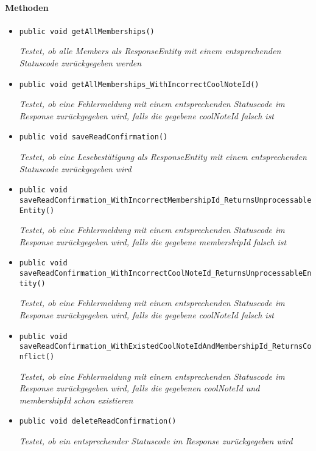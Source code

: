  \paragraph*{Methoden}
 \begin{itemize}
 	\item{\texttt{public void getAllMemberships()}}
 	
 	\textit{Testet, ob alle Members als ResponseEntity mit einem entsprechenden Statuscode zurückgegeben werden}
 	
 	\item{\texttt{public void getAllMemberships\_WithIncorrectCoolNoteId()}}
 	
 	\textit{Testet, ob eine Fehlermeldung mit einem entsprechenden Statuscode im Response zurückgegeben wird, falls die gegebene coolNoteId falsch ist}
 	
 	\item{\texttt{public void saveReadConfirmation()}}
 	
 	\textit{Testet, ob eine Lesebestätigung als ResponseEntity mit einem entsprechenden Statuscode zurückgegeben wird}
 	
 	\item{\texttt{public void saveReadConfirmation\_WithIncorrectMembershipId\_Returns\-UnprocessableEntity()}}
 	
 	\textit{Testet, ob eine Fehlermeldung mit einem entsprechenden Statuscode im Response zurückgegeben wird, falls die gegebene membershipId falsch ist}
 	
 	\item{\texttt{public void saveReadConfirmation\_WithIncorrectCoolNoteId\_Returns\-UnprocessableEntity()}}
 	
 	\textit{Testet, ob eine Fehlermeldung mit einem entsprechenden Statuscode im Response zurückgegeben wird, falls die gegebene coolNoteId falsch ist}
 	
 	\item{\texttt{public void saveReadConfirmation\_WithExistedCoolNoteId\-AndMembershipId\_ReturnsConflict()}}
 	
 	\textit{Testet, ob eine Fehlermeldung mit einem entsprechenden Statuscode im Response zurückgegeben wird, falls die gegebenen coolNoteId und membershipId schon existieren} 	
 	
 	\item{\texttt{public void deleteReadConfirmation()}}
 	
 	\textit{Testet, ob ein entsprechender Statuscode im Response zurückgegeben wird}
 	

\end{itemize}
